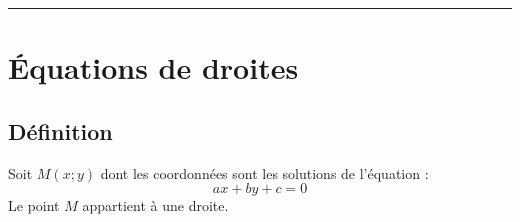 \def\Titre{Arithmétique}
\def\Classe{2nde}


\DoTitle
\tableofcontents
\begin{center}\rule{0.5\textwidth}{1pt}\end{center}
\section{Équations de droites}
\subsection{Définition}
 Soit $M(x;y)$ dont les coordonnées sont les solutions de l'équation :
$$ax+by+c=0$$
Le point $M$ appartient à une droite.

